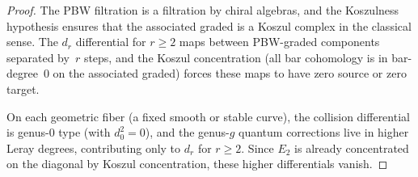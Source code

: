 \documentclass[11pt]{article}
\begin{document}
\begin{proof}
The PBW filtration is a filtration by chiral algebras, and the
Koszulness hypothesis ensures that the associated graded is a
Koszul complex in the classical sense.  The $d_r$ differential
for $r \geq 2$ maps between PBW-graded components separated
by~$r$ steps, and the Koszul concentration (all bar cohomology
is in bar-degree~$0$ on the associated graded) forces these maps
to have zero source or zero target.

On each geometric fiber (a fixed smooth or stable curve), the
collision differential is genus-$0$ type (with $d_0^2 = 0$), and
the genus-$g$ quantum corrections live in higher Leray degrees,
contributing only to $d_r$ for $r \geq 2$.  Since $E_2$ is
already concentrated on the diagonal by Koszul concentration,
these higher differentials vanish.
\end{proof}
\end{document}
